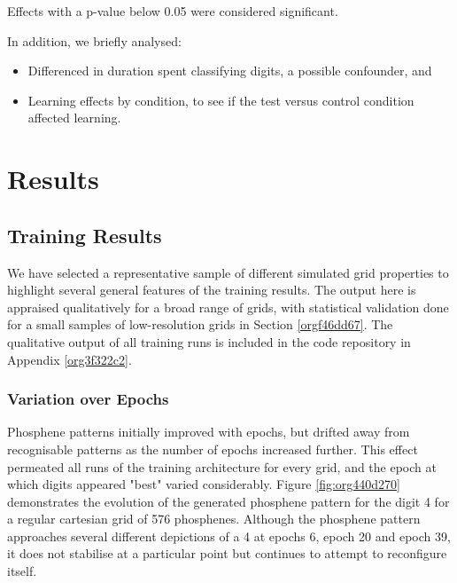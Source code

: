\documentclass[a4paper,11pt,openany]{book}
\begin{document}
Effects with a p-value below 0.05 were considered significant.

In addition, we briefly analysed:
\begin{itemize}
\item Differenced in duration spent classifying digits, a possible confounder, and
\item Learning effects by condition, to see if the test versus control condition affected learning.
\end{itemize}

\part{Results}
\label{sec:org04b5b41}
\chapter{Training Results}
\label{sec:orgec54af5}

We have selected a representative sample of different simulated grid properties to highlight several general features of the training results.
The output here is appraised qualitatively for a broad range of grids, with statistical validation done for a small samples of low-resolution grids in Section \ref{orgf46dd67}.
The qualitative output of all training runs is included in the code repository in Appendix \ref{org3f322c2}.

\section*{Variation over Epochs}
\label{sec:org64df809}

Phosphene patterns initially improved with epochs, but drifted away from recognisable patterns as the number of epochs increased further.
This effect permeated all runs of the training architecture for every grid, and the epoch at which digits appeared "best" varied considerably.
Figure \ref{fig:org440d270} demonstrates the evolution of the generated phosphene pattern for the digit 4 for a regular cartesian grid of 576 phosphenes.
Although the phosphene pattern approaches several different depictions of a 4 at epochs 6, epoch 20 and epoch 39, it does not stabilise at a particular point but continues to attempt to reconfigure itself.
\end{document}

